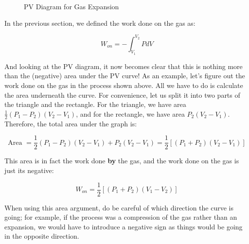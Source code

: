 \begin{figure}[H]
	\centering
	\caption{PV Diagram for Gas Expansion}
\end{figure}

In the previous section, we defined the work done on the gas as:

\[ W_{on} = -\int_{V_1}^{V_2} PdV \]

And looking at the PV diagram, it now becomes clear that this is nothing more than the (negative) area under the PV curve! As an example, let's figure out the work done on the gas in the process shown above. All we have to do is calculate the area underneath the curve. For convenience, let us split it into two parts of the triangle and the rectangle. For the triangle, we have area $\frac{1}{2}\left(P_1-P_2\right)\left(V_2-V_1\right)$, and for the rectangle, we have area $P_2\left(V_2-V_1\right)$. Therefore, the total area under the graph is:

\[ \text{Area } = \frac{1}{2}\left(P_1-P_2\right)\left(V_2-V_1\right) + P_2\left(V_2-V_1\right) = \frac{1}{2}\left[\left(P_1+P_2\right)\left(V_2-V_1\right) \right]\]

This area is in fact the work done \textbf{by} the gas, and the work done on the gas is just its negative:

\[W_{on} = \frac{1}{2}\left[\left(P_1+P_2\right)\left(V_1-V_2\right) \right]\]

When using this area argument, do be careful of which direction the curve is going; for example, if the process was a compression of the gas rather than an expansion, we would have to introduce a negative sign as things would be going in the opposite direction.

